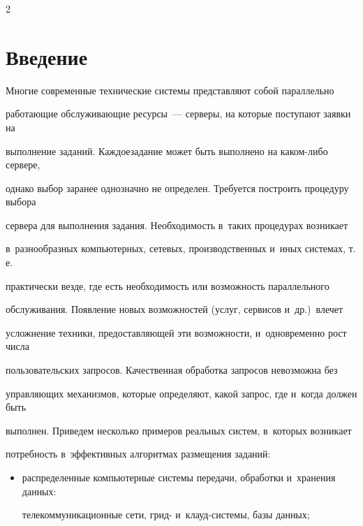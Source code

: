 \begin{multicols}{2}





\label{st\stat}





\section{Введение}





    Многие современные технические системы представляют собой параллельно 


работающие обслуживающие ресурсы~--- серверы, на которые поступают заявки на 


выполнение заданий. Каж\-дое\linebreak зада\-ние может быть выполнено на ка\-ком-ли\-бо сервере, 


однако выбор заранее однозначно не определен. Требуется построить процедуру выбора 


сервера для выполнения задания. Необходимость в~таких процедурах возникает 


в~разнообразных компьютерных, сетевых, производственных и~иных сис\-те\-мах, т.\,е.\ 


практически везде, где есть необходимость или возможность параллельного 


обслуживания. Появление новых возможностей (услуг, сервисов и~др.)\ влечет 


усложнение техники, пред\-остав\-ля\-ющей эти возможности, и~одновременно рост числа 


пользовательских запросов. Качественная обработка запросов невозможна без 


управляющих механизмов, которые определяют, какой запрос, где и~когда должен быть 


выполнен. Приведем несколько примеров реальных систем, в~которых возникает 


потребность в~эффективных алгоритмах размещения заданий:


    \begin{itemize}


\item распределенные компьютерные системы передачи, обработки и~хранения данных: 


телекоммуникационные сети, грид- и~клауд-сис\-те\-мы, базы данных;



\end{itemize}
\end{multicols}
